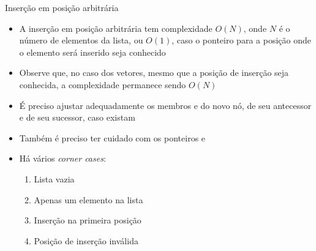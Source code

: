 \begin{frame}[fragile]{Inserção em posição arbitrária}

    \begin{itemize}
        \item A inserção em posição arbitrária tem complexidade $O(N)$, onde $N$ é o número
            de elementos da lista, ou $O(1)$, caso o ponteiro para a posição onde o elemento
            será inserido seja conhecido

        \item Observe que, no caso dos vetores, mesmo que a posição de inserção seja conhecida,
            a complexidade permanece sendo $O(N)$

        \item É preciso ajustar adequadamente os membros  e  do
            novo nó, de seu antecessor e de seu sucessor, caso existam

        \item Também é preciso ter cuidado com os ponteiros  e 

        \item Há vários \textit{corner cases}:
            \begin{enumerate}
                \item Lista vazia
                \item Apenas um elemento na lista
                \item Inserção na primeira posição
                \item Posição de inserção inválida
            \end{enumerate}

    \end{itemize}

\end{frame}
